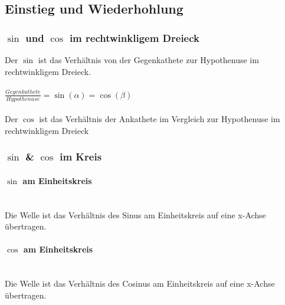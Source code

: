 \subsection{Einstieg und Wiederhohlung}

\subsubsection{$\sin$ und $\cos$ im rechtwinkligem Dreieck}
Der $\sin$ ist das Verhältnis von der Gegenkathete zur Hypothenuse im rechtwinkligem Dreieck.\\~ \\
$\frac{Gegenkathete}{Hypothenuse}=\sin(\alpha)=\cos(\beta)$\\~\\
Der $\cos$ ist das Verhältnis der Ankathete im Vergleich zur Hypothenuse im rechtwinkligem Dreieck

\subsubsection{$\sin$ \& $\cos$ im Kreis}
\paragraph*{$\sin$ am Einheitskreis}~\\
Die Welle ist das Verhältnis des Sinus am Einheitskreis auf eine x-Achse übertragen.
\paragraph*{$\cos$ am Einheitskreis}~\\
Die Welle ist das Verhältnis des Cosinus am Einheitskreis auf eine x-Achse übertragen.\\~\\
\hyperlink{https://upload.wikimedia.org/wikipedia/commons/f/f3/Sinus_und_Cosinus_am_Einheitskreis.gif}{\textcolor{RedViolet}{\textbf{}}}\\

